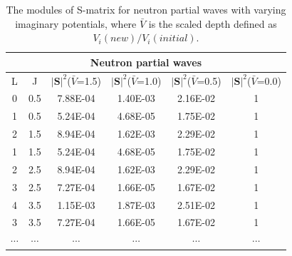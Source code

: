\begin{table}[]
\centering
\begin{tabular}{cccccc}
\toprule
\toprule
\multicolumn{6}{c}{Neutron partial waves}                                                                         \\
 \midrule
L                     & J                     & $|\mathbf{S}|^2$($\bar{V}$=1.5) & $|\mathbf{S}|^2$($\bar{V}$=1.0) & $|\mathbf{S}|^2$($\bar{V}$=0.5) & $|\mathbf{S}|^2$($\bar{V}$=0.0) \\
0 & 0.5 & 7.88E-04                     & 1.40E-03                     & 2.16E-02                     & 1                            \\
1 & 0.5 & 5.24E-04                     & 4.68E-05                     & 1.75E-02                     & 1                            \\
2 & 1.5 & 8.94E-04                     & 1.62E-03                     & 2.29E-02                     & 1                            \\
1 & 1.5 & 5.24E-04                     & 4.68E-05                     & 1.75E-02                     & 1                            \\
2 & 2.5 & 8.94E-04                     & 1.62E-03                     & 2.29E-02                     & 1                            \\
3 & 2.5 & 7.27E-04                     & 1.66E-05                     & 1.67E-02                     & 1                            \\
4 & 3.5 & 1.15E-03                     & 1.87E-03                     & 2.51E-02                     & 1                            \\
3 & 3.5 & 7.27E-04                     & 1.66E-05                     & 1.67E-02                     & 1                            \\$\cdots$           &$\cdots$                    & $\cdots$                            & $\cdots$                           & $\cdots$                           & $\cdots$                                                                \\
\bottomrule
\bottomrule
\end{tabular}
\caption{The modules of S-matrix for neutron partial waves with varying imaginary potentials, where $\bar{V}$ is the scaled depth defined as $V_i(new)/V_i(initial)$.}
\label{nSmatrix}
\end{table}

